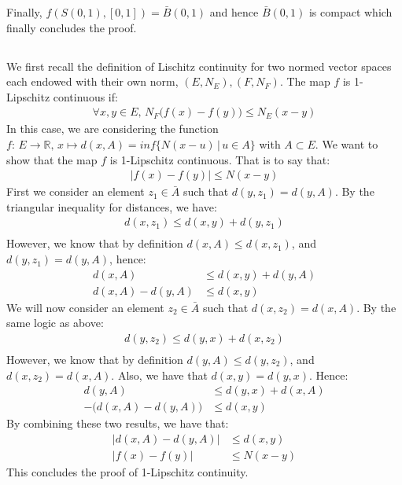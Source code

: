 \documentclass{article}
\begin{document}
\noindent Finally, $f(S(0,1), [0,1]) = \bar{B}(0,1)$ and hence $\bar{B}(0,1)$ is compact which finally concludes the proof. 


\subsection{} %

We first recall the definition of Lischitz continuity for two normed vector spaces each endowed with their own norm, $(E,N_E), (F,N_F)$. The map $f$ is 1-Lipschitz continuous if:
\begin{align*}
	\forall x,y \in E, \, N_F\big( f(x) - f(y) \big) \leq N_E(x-y)
\end{align*}
In this case, we are considering the function $f:\, E \rightarrow \mathbb{R}, \, x \mapsto d(x,A) = inf\{ N(x-u) \, | \, u \in A \}$  with $A \subset E$. We want to show that the map $f$ is 1-Lipschitz continuous. That is to say that:
\begin{align*}
	\big| f(x) - f(y) \big| \leq N(x-y)
\end{align*}
First we consider an element $z_1 \in \bar{A}$ such that $d(y,z_1) = d(y,A)$. By the triangular inequality for distances, we have:
\begin{align*}
	d(x,z_1) \leq d(x,y) + d(y,z_1)\\
\end{align*}
However, we know that by definition $d(x,A) \leq d(x,z_1)$, and $d(y,z_1) = d(y,A)$, hence:
\begin{align*}
	d(x,A) &\leq d(x,y) + d(y,A)\\
	d(x,A) - d(y,A) &\leq d(x,y)
\end{align*}
We will now consider an element $z_2 \in \bar{A}$ such that $d(x,z_2) = d(x,A)$. By the same logic as above:
\begin{align*}
	d(y,z_2) \leq d(y,x) + d(x,z_2)\\
\end{align*}
However, we know that by definition $d(y,A) \leq d(y,z_2)$, and $d(x,z_2) = d(x,A)$. Also, we have that $d(x,y) = d(y,x)$. Hence:
\begin{align*}
	d(y,A) &\leq d(y,x) + d(x,A)\\
	-\big( d(x,A) - d(y,A) \big) &\leq d(x,y)
\end{align*}
By combining these two results, we have that:
\begin{align*}
	\big| d(x,A) - d(y,A) \big| &\leq d(x,y)\\
	\big| f(x) - f(y) \big| &\leq N(x-y)
\end{align*}
This concludes the proof of 1-Lipschitz continuity.
\end{document}
